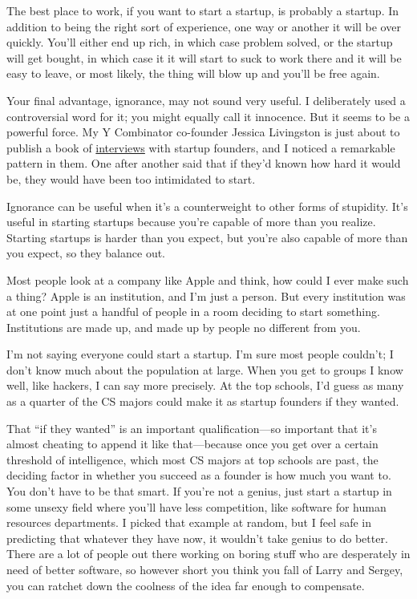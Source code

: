 The best place to work, if you want to start a startup, is probably a
startup. In addition to being the right sort of experience, one way or
another it will be over quickly. You'll either end up rich, in which
case problem solved, or the startup will get bought, in which case it it
will start to suck to work there and it will be easy to leave, or most
likely, the thing will blow up and you'll be free again.

Your final advantage, ignorance, may not sound very useful. I
deliberately used a controversial word for it; you might equally call it
innocence. But it seems to be a powerful force. My Y Combinator
co-founder Jessica Livingston is just about to publish a book of
\href{http://www.amazon.com/gp/product/1590597141}{interviews} with
startup founders, and I noticed a remarkable pattern in them. One after
another said that if they'd known how hard it would be, they would have
been too intimidated to start.

Ignorance can be useful when it's a counterweight to other forms of
stupidity. It's useful in starting startups because you're capable of
more than you realize. Starting startups is harder than you expect, but
you're also capable of more than you expect, so they balance out.

Most people look at a company like Apple and think, how could I ever
make such a thing? Apple is an institution, and I'm just a person. But
every institution was at one point just a handful of people in a room
deciding to start something. Institutions are made up, and made up by
people no different from you.

I'm not saying everyone could start a startup. I'm sure most people
couldn't; I don't know much about the population at large. When you get
to groups I know well, like hackers, I can say more precisely. At the
top schools, I'd guess as many as a quarter of the CS majors could make
it as startup founders if they wanted.

That ``if they wanted'' is an important qualification---so important
that it's almost cheating to append it like that---because once you get
over a certain threshold of intelligence, which most CS majors at top
schools are past, the deciding factor in whether you succeed as a
founder is how much you want to. You don't have to be that smart. If
you're not a genius, just start a startup in some unsexy field where
you'll have less competition, like software for human resources
departments. I picked that example at random, but I feel safe in
predicting that whatever they have now, it wouldn't take genius to do
better. There are a lot of people out there working on boring stuff who
are desperately in need of better software, so however short you think
you fall of Larry and Sergey, you can ratchet down the coolness of the
idea far enough to compensate.

